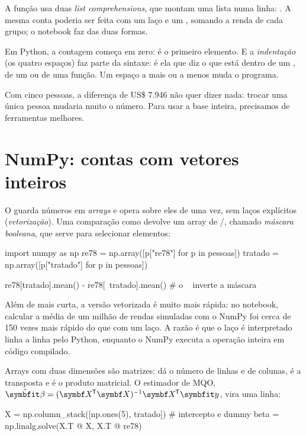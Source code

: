 A função  usa duas \emph{list comprehensions}, que montam
uma lista numa linha: . A mesma conta
poderia ser feita com um laço  e um , somando a renda de cada
grupo; o notebook faz das duas formas.

\begin{atencao}
Em Python, a contagem começa em zero:  é o primeiro elemento.
E a \emph{indentação} (os quatro espaços) faz parte da sintaxe: é ela que diz o
que está dentro de um , de um  ou de uma função. Um espaço a
mais ou a menos muda o programa.
\end{atencao}

Com cinco pessoas, a diferença de US\$ 7.946 não quer dizer nada: trocar uma
única pessoa mudaria muito o número. Para usar a base inteira, precisamos de
ferramentas melhores.

\section{NumPy: contas com vetores inteiros}

O  guarda números em \emph{arrays} e opera sobre eles de uma vez,
sem laços explícitos (\emph{vetorização}). Uma comparação como
 devolve um array de /, chamado
\emph{máscara booleana}, que serve para selecionar elementos:

\begin{codigo}
import numpy as np
re78 = np.array([p["re78"] for p in pessoas])
tratado = np.array([p["tratado"] for p in pessoas])

re78[tratado].mean() - re78[~tratado].mean()   # o ~ inverte a máscara
\end{codigo}

Além de mais curta, a versão vetorizada é muito mais rápida: no notebook,
calcular a média de um milhão de rendas simuladas com o NumPy foi cerca de 150
vezes mais rápido do que com um laço. A razão é que o laço é interpretado linha
a linha pelo Python, enquanto o NumPy executa a operação inteira em código
compilado.

Arrays com duas dimensões são matrizes:  dá o número de linhas e de
colunas,  é a transposta e  é o produto matricial. O estimador de
MQO, $\hvbeta = (\mX\T\mX)^{-1}\mX\T\vy$, vira uma linha:

\begin{codigo}
X = np.column_stack([np.ones(5), tratado])   # intercepto e dummy
beta = np.linalg.solve(X.T @ X, X.T @ re78)
\end{codigo}

